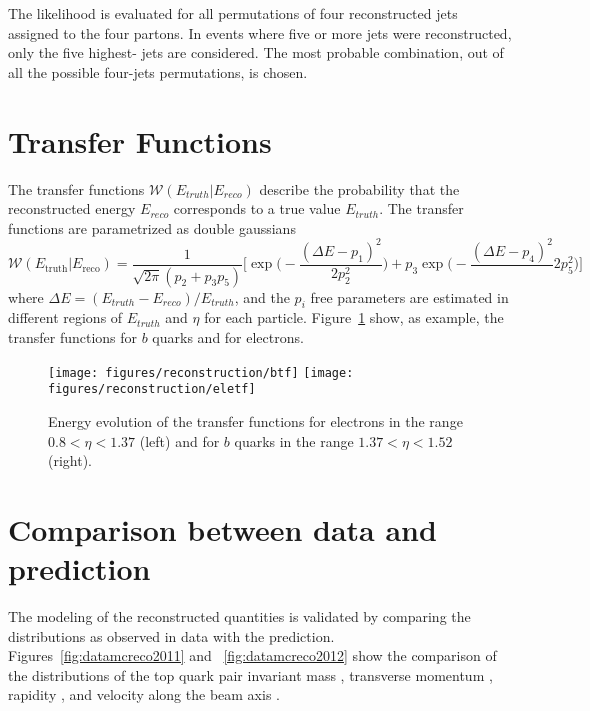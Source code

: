 The likelihood is evaluated for all permutations of four reconstructed
jets assigned to the four partons.
In events where five or more jets were reconstructed, only
the five highest-\pt{} jets are considered. The most probable
combination, out of all the possible four-jets permutations, is
chosen. 

\section{Transfer Functions}
\label{sec:transferfunctions}

The transfer functions $\mathcal{W}(E_{truth}|E_{reco})$ describe the probability that the
reconstructed energy $E_{reco}$ corresponds to a true value
$E_{truth}$.
The transfer functions are parametrized as double gaussians
\begin{equation}
  \label{eq:doublegaus}
  \mathcal{W}(E_\mathrm{truth}|E_\mathrm{reco}) = \frac{1}{\sqrt{2\pi}(p_2+p_3p_5)}\Bigg[ \exp\Bigg(-\frac{(\Delta E - p_1)^2}{2p_2^2}\Bigg) + p_3\exp\Bigg(-\frac{(\Delta E - p_4)^2}\
  {2p_5^2}\Bigg) \Bigg]\phantom{,}
\end{equation}
where $\Delta E = (E_{truth}-E_{reco})/E_{truth}$, and the $p_i$
free parameters are estimated in different regions of $E_{truth}$ and
$\eta$ for each particle. Figure~\ref{fig:transferfunctions} show, as
example, the transfer functions for $b$ quarks and for electrons.  

\begin{figure}[!htb]\centering
  \texttt{[image: figures/reconstruction/btf]}
  \texttt{[image: figures/reconstruction/eletf]}
  \caption[Energy evolution of transfer functions]{
    Energy evolution of the transfer functions for electrons in the
    range $0.8<\eta<1.37$ (left) and for $b$ quarks in the range
    $1.37<\eta<1.52$ (right). 
    \label{fig:transferfunctions}
    }
\end{figure}

\section{Comparison between data and prediction}
\label{sec:datamcreco}

The modeling of the reconstructed quantities is validated by comparing
the distributions as observed in data with the prediction. 
Figures~\ref{fig:datamcreco2011} and ~\ref{fig:datamcreco2012} show the comparison of the distributions of
the top quark pair invariant mass \mtt{}, transverse momentum \pttt{},
rapidity \ytt{}, and velocity along the beam axis \betatt{}. 
                                   
